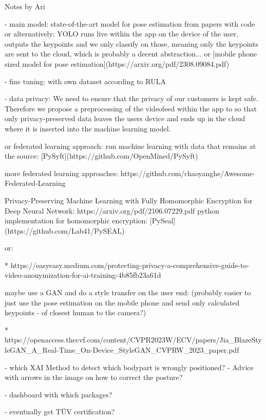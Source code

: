 
Notes by Ari

- main model:
state-of-the-art model for pose estimation from papers with code
or alternatively:
YOLO runs live within the app on the device of the user, outputs the keypoints and we only classify on those, meaning only the keypoints are sent to the cloud, which is probably a decent abstraction...
or
[mobile phone sized model for pose estimation](https://arxiv.org/pdf/2308.09084.pdf)

- fine tuning:
with own dataset according to RULA

- data privacy:
We need to ensure that the privacy of our customers is kept safe. Therefore we propose a preprocessing of the videofeed within the app to so that only privacy-preserved data leaves the users device and ends up in the cloud where it is inserted into the machine learning model.

or federated learning approach:
run machine learning with data that remains at the source:
[PySyft](https://github.com/OpenMined/PySyft)

more federated learning approaches:
https://github.com/chaoyanghe/Awesome-Federated-Learning

Privacy-Preserving Machine Learning with Fully Homomorphic Encryption for Deep Neural Network:
https://arxiv.org/pdf/2106.07229.pdf
python implementation for homomorphic encryption: [PySeal](https://github.com/Lab41/PySEAL)

or:

* https://easyeasy.medium.com/protecting-privacy-a-comprehensive-guide-to-video-anonymization-for-ai-training-4b85fb23a61d

maybe use a GAN and do a style transfer on the user end: (probably easier to just use the pose estimation on the mobile phone and send only calculated keypoints - of closest human to the camera?)

* https://openaccess.thecvf.com/content/CVPR2023W/ECV/papers/Jia_BlazeStyleGAN_A_Real-Time_On-Device_StyleGAN_CVPRW_2023_paper.pdf



- which XAI Method to detect which bodypart is wrongly positioned?
- Advice with arrows in the image on how to correct the posture?

- dashboard with which packages?

- eventually get TÜV certification?
